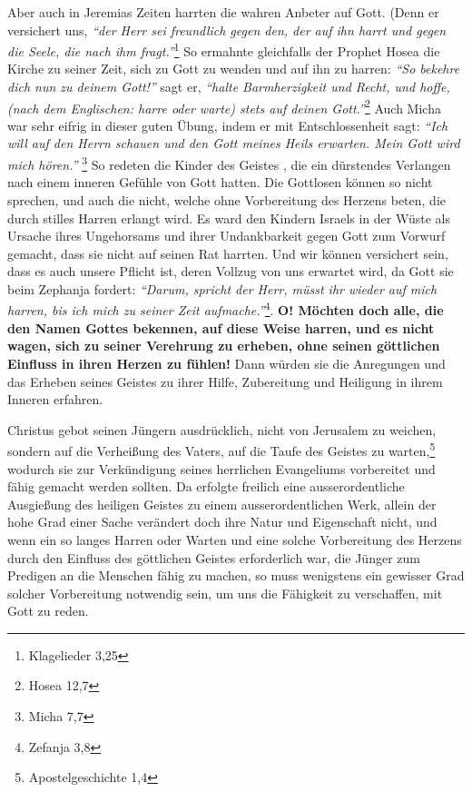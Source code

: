 \medskip

Aber auch in Jeremias  Zeiten harrten die wahren
Anbeter auf Gott. (Denn er
versichert uns,
\textit{ "`der Herr sei freundlich gegen den, der auf ihn harrt und
gegen die Seele, die nach ihm fragt."'}\footnote{Klagelieder 3,25}
So ermahnte
gleichfalls der Prophet Hosea  die Kirche zu seiner Zeit,
sich zu Gott zu wenden
und auf ihn zu harren:
\textit{"`So bekehre dich nun zu deinem Gott!"'} sagt er,
\textit{"`halte
Barmherzigkeit und Recht, und hoffe, (nach dem Englischen: harre oder warte)
stets auf deinen Gott."'}\footnote{Hosea 12,7}
Auch Micha  war sehr eifrig in
dieser guten Übung, indem er mit Entschlossenheit sagt:
\textit{"`Ich will auf den
Herrn schauen und den Gott meines Heils erwarten. Mein Gott wird mich
hören."'}
\footnote{Micha 7,7}
So redeten die Kinder des Geistes , die ein
dürstendes Verlangen nach einem inneren Gefühle von Gott hatten. Die Gottlosen
können so nicht sprechen, und auch die nicht, welche ohne Vorbereitung des
Herzens beten, die durch stilles Harren erlangt wird. Es ward den Kindern
Israels 
in der Wüste als Ursache ihres Ungehorsams und ihrer Undankbarkeit
gegen Gott zum Vorwurf gemacht, dass sie nicht auf seinen Rat harrten. Und
wir können versichert sein, dass es auch unsere Pflicht ist, deren Vollzug
von uns erwartet wird, da Gott sie beim Zephanja 
 fordert:
\textit{"`Darum, spricht
der Herr, müsst ihr wieder auf mich harren, bis ich mich zu seiner
Zeit aufmache."'}\footnote{Zefanja 3,8}.
\textbf{O! Möchten doch alle, die den Namen
Gottes
bekennen, auf diese Weise harren, und es nicht wagen, sich zu seiner Verehrung
zu erheben, ohne seinen göttlichen Einfluss in ihren Herzen zu fühlen!} Dann
würden sie die Anregungen und das Erheben seines Geistes zu ihrer Hilfe,
Zubereitung
und Heiligung in ihrem Inneren erfahren.

\medskip

Christus gebot seinen Jüngern ausdrücklich, nicht von Jerusalem
 zu weichen,
sondern auf die Verheißung des Vaters, auf die Taufe des Geistes
 zu
warten,\footnote{Apostelgeschichte 1,4}
wodurch sie zur Verkündigung  seines herrlichen
Evangeliums vorbereitet und fähig gemacht werden sollten. Da erfolgte freilich
eine ausserordentliche Ausgießung  des heiligen Geistes zu
einem
ausserordentlichen Werk, allein der hohe Grad einer Sache verändert doch ihre
Natur und Eigenschaft nicht, und wenn ein so langes Harren oder Warten und eine
solche Vorbereitung des Herzens durch den Einfluss des göttlichen Geistes
erforderlich war, die Jünger zum Predigen an die Menschen fähig zu machen, so
muss wenigstens ein gewisser Grad solcher Vorbereitung notwendig sein, um uns
die Fähigkeit zu verschaffen, mit Gott zu reden.

